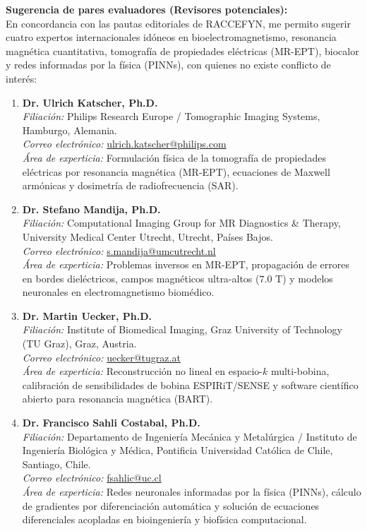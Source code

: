 \documentclass[11pt,a4paper]{article}
\begin{document}
\noindent\textbf{Sugerencia de pares evaluadores (Revisores potenciales):}\\
En concordancia con las pautas editoriales de RACCEFYN, me permito sugerir cuatro expertos internacionales idóneos en bioelectromagnetismo, resonancia magnética cuantitativa, tomografía de propiedades eléctricas (MR-EPT), biocalor y redes informadas por la física (PINNs), con quienes no existe conflicto de interés:
\begin{enumerate}
    \item \textbf{Dr. Ulrich Katscher, Ph.D.}\\
    \textit{Filiación:} Philips Research Europe / Tomographic Imaging Systems, Hamburgo, Alemania.\\
    \textit{Correo electrónico:} \href{mailto:ulrich.katscher@philips.com}{ulrich.katscher@philips.com}\\
    \textit{Área de experticia:} Formulación física de la tomografía de propiedades eléctricas por resonancia magnética (MR-EPT), ecuaciones de Maxwell armónicas y dosimetría de radiofrecuencia (SAR).
    
    \item \textbf{Dr. Stefano Mandija, Ph.D.}\\
    \textit{Filiación:} Computational Imaging Group for MR Diagnostics \& Therapy, University Medical Center Utrecht, Utrecht, Países Bajos.\\
    \textit{Correo electrónico:} \href{mailto:s.mandija@umcutrecht.nl}{s.mandija@umcutrecht.nl}\\
    \textit{Área de experticia:} Problemas inversos en MR-EPT, propagación de errores en bordes dieléctricos, campos magnéticos ultra-altos ($7.0\text{ T}$) y modelos neuronales en electromagnetismo biomédico.
    
    \item \textbf{Dr. Martin Uecker, Ph.D.}\\
    \textit{Filiación:} Institute of Biomedical Imaging, Graz University of Technology (TU Graz), Graz, Austria.\\
    \textit{Correo electrónico:} \href{mailto:uecker@tugraz.at}{uecker@tugraz.at}\\
    \textit{Área de experticia:} Reconstrucción no lineal en espacio-$k$ multi-bobina, calibración de sensibilidades de bobina ESPIRiT/SENSE y software científico abierto para resonancia magnética (BART).
    
    \item \textbf{Dr. Francisco Sahli Costabal, Ph.D.}\\
    \textit{Filiación:} Departamento de Ingeniería Mecánica y Metalúrgica / Instituto de Ingeniería Biológica y Médica, Pontificia Universidad Católica de Chile, Santiago, Chile.\\
    \textit{Correo electrónico:} \href{mailto:fsahlic@uc.cl}{fsahlic@uc.cl}\\
    \textit{Área de experticia:} Redes neuronales informadas por la física (PINNs), cálculo de gradientes por diferenciación automática y solución de ecuaciones diferenciales acopladas en bioingeniería y biofísica computacional.
\end{enumerate}
\end{document}
